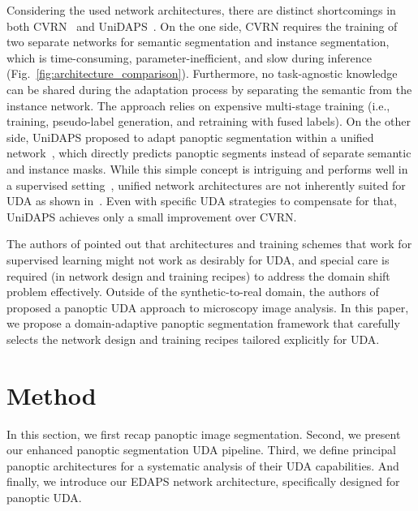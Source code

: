 \documentclass[10pt,twocolumn,letterpaper]{article}
\makeatletter
\renewcommand{\paragraph}{\@startsection{paragraph}{4}{\z@}{1.0ex \@plus 1ex \@minus .2ex}{-1em}{\normalfont\normalsize\bfseries}}
\makeatother
\begin{document}
\paragraph{UDA for Panoptic Segmentation}
Considering the used network architectures, there are distinct shortcomings in both CVRN~\cite{huang2021cross} and UniDAPS~\cite{zhang2022hierarchical}.
On the one side, CVRN requires the training of two separate networks for semantic segmentation and instance segmentation, which is time-consuming, parameter-inefficient, and slow during inference (Fig.~\ref{fig:architecture_comparison}). 
Furthermore, no task-agnostic knowledge can be shared during the adaptation process by separating the semantic from the instance network.
The approach relies on expensive multi-stage training (i.e., training, pseudo-label generation, and retraining with fused labels).
On the other side, UniDAPS proposed to adapt panoptic segmentation within a unified network~\cite{carion2020end}, which directly predicts panoptic segments instead of separate semantic and instance masks.
While this simple concept is intriguing and performs well in a supervised setting~\cite{carion2020end, cheng2021per, li2022panoptic}, unified network architectures are not inherently suited for UDA as shown in~\cite{zhang2022hierarchical}. Even with specific UDA strategies to compensate for that, UniDAPS achieves only a small improvement over CVRN.

The authors of \cite{hoyer2021daformer} pointed out that architectures and training schemes that work for supervised learning might not work as desirably for UDA, and special care is required (in network design and training recipes) to address the domain shift problem effectively.
Outside of the synthetic-to-real domain, the authors of~\cite{pdam} proposed a panoptic UDA approach to microscopy image analysis.
In this paper, we propose a domain-adaptive panoptic segmentation framework that carefully selects the network design and training recipes tailored explicitly for UDA.
 \section{Method}
\label{sec:method}


In this section, we first recap panoptic image segmentation. Second, we present our enhanced panoptic segmentation UDA pipeline. Third, we define principal panoptic architectures for a systematic analysis of their UDA capabilities. And finally, we introduce our EDAPS network architecture, specifically designed for panoptic UDA.
\end{document}
